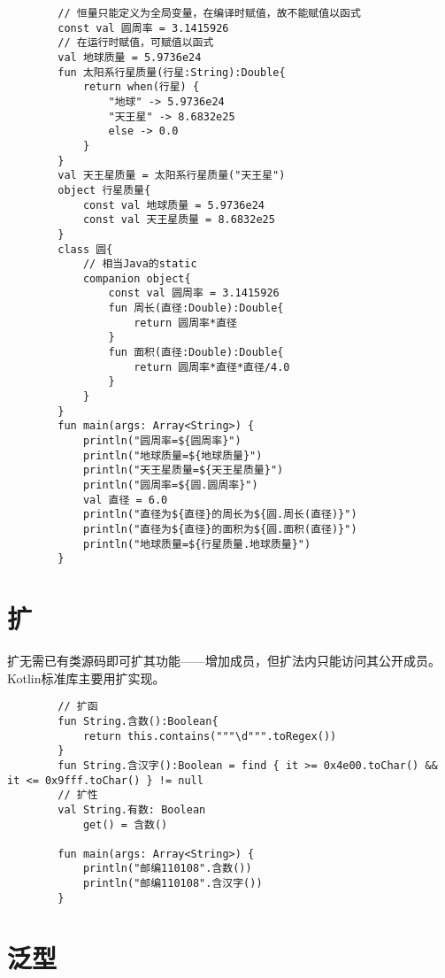     \begin{verbatim}
        // 恒量只能定义为全局变量，在编译时赋值，故不能赋值以函式
        const val 圆周率 = 3.1415926
        // 在运行时赋值，可赋值以函式
        val 地球质量 = 5.9736e24
        fun 太阳系行星质量(行星:String):Double{
            return when(行星) {
                "地球" -> 5.9736e24
                "天王星" -> 8.6832e25
                else -> 0.0
            }
        }
        val 天王星质量 = 太阳系行星质量("天王星")
        object 行星质量{
            const val 地球质量 = 5.9736e24
            const val 天王星质量 = 8.6832e25
        }
        class 圆{
            // 相当Java的static
            companion object{
                const val 圆周率 = 3.1415926
                fun 周长(直径:Double):Double{
                    return 圆周率*直径
                }
                fun 面积(直径:Double):Double{
                    return 圆周率*直径*直径/4.0
                }
            }
        }
        fun main(args: Array<String>) {
            println("圆周率=${圆周率}")
            println("地球质量=${地球质量}")
            println("天王星质量=${天王星质量}")
            println("圆周率=${圆.圆周率}")
            val 直径 = 6.0
            println("直径为${直径}的周长为${圆.周长(直径)}")
            println("直径为${直径}的面积为${圆.面积(直径)}")
            println("地球质量=${行星质量.地球质量}")
        }        
    \end{verbatim}

\section{扩}
扩无需已有类源码即可扩其功能——增加成员，但扩法内只能访问其公开成员。Kotlin标准库主要用扩实现。

    \begin{verbatim}
        // 扩函
        fun String.含数():Boolean{
            return this.contains("""\d""".toRegex())
        }
        fun String.含汉字():Boolean = find { it >= 0x4e00.toChar() && it <= 0x9fff.toChar() } != null
        // 扩性
        val String.有数: Boolean
            get() = 含数()
        
        fun main(args: Array<String>) {
            println("邮编110108".含数())
            println("邮编110108".含汉字())
        }            
    \end{verbatim}

\section{泛型}
